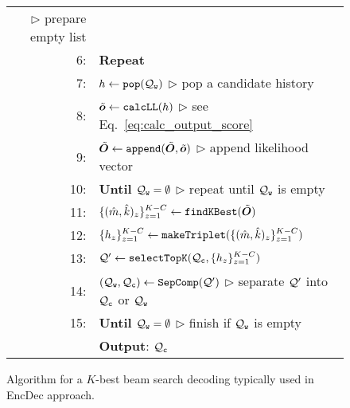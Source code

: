 \documentclass[11pt]{article}
\begin{document}
\begin{figure}[t]
\begin{tabular}{rp{71mm}}
      \hspace{\fill}$\triangleright$ {\scriptsize prepare empty list}
      \\
  6:&\hspace{3.0mm}
      \textbf{Repeat} \\
  7:&\hspace{6.0mm}
      $h \leftarrow {\tt pop}({\cal Q}_{\tt w})$
      \hspace{\fill}$\triangleright$ {\scriptsize pop a candidate history}
      \\
  8:&\hspace{6.0mm}
      $\tilde{\bm{o}} \leftarrow {\tt calcLL}(h)$
      \hspace{\fill}$\triangleright$ {\scriptsize see Eq.~\ref{eq:calc_output_score} }
      \\
  9:&\hspace{6.0mm}
      $\tilde{\bm{O}} \leftarrow {\tt append}(\tilde{\bm{O}},\tilde{\bm{o}})$
      \hspace{\fill}$\triangleright$ {\scriptsize append likelihood vector}
      \\
  10:&\hspace{3.0mm}
      \textbf{Until} ${\cal Q}_{\tt w} = \emptyset$
      \hspace{\fill}$\triangleright$ {\scriptsize repeat until ${\cal Q}_{\tt w}$ is empty}
      \\
  11:&\hspace{3.0mm}
      $\{(\hat{m},\hat{k})_{z}\}^{K-C}_{z=1} \leftarrow {\tt findKBest}(\tilde{\bm{O}})$
      \\
  12:&\hspace{3.0mm}
      $\{h_{z}\}^{K-C}_{z=1} \leftarrow {\tt makeTriplet}(\{(\hat{m},\hat{k})_{z}\}_{z=1}^{K-C} ) $
      \\
  13:&\hspace{3.0mm}
      ${\cal Q}' \leftarrow {\tt selectTopK}({\cal Q}_{\tt c}, \{h_{z}\}_{z=1}^{K-C}) $
      \\
  14:&\hspace{3.0mm}
      $({\cal Q}_{\tt w}, {\cal Q}_{\tt c}) \leftarrow {\tt SepComp}({\cal Q}') $
      \hspace{\fill}$\triangleright$ {\scriptsize separate ${\cal Q}'$ into ${\cal Q}_{\tt c}$ or ${\cal Q}_{\tt w}$}
      \\
  15:&\hspace{0.0em}
      \textbf{Until} ${\cal Q}_{\tt w} = \emptyset$
      \hspace{\fill}$\triangleright$ {\scriptsize finish if ${\cal Q}_{\tt w}$ is empty}
      \\
  \  &\hspace{-1.2em}\textbf{Output}: ${\cal Q}_{\tt c}$
      \\
  \hline
 \end{tabular}
 \caption{Algorithm for a $K$-best beam search decoding typically used in EncDec approach.}
 \label{fig:beam_search}
\end{figure}
\end{document}
